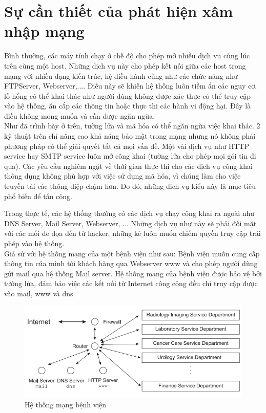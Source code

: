 \section{Sự cần thiết của phát hiện xâm nhập mạng}

\indent Bình thường, các máy tính chạy ở chế độ cho phép mở nhiều dịch vụ cùng lúc trên cùng một host. Những dịch vụ này cho phép kết nối giữa các host trong mạng với nhiều dạng kiến trúc, hệ điều hành cũng như các chức năng như FTPServer, Webserver,.... Điều này sẽ khiến hệ thống luôn tiềm ẩn các nguy cơ, lỗ hổng có thể khai thác như người dùng không được xác thực có thể truy cập vào hệ thống, ăn cắp các thông tin hoặc thực thi các hành vi động hại. Đây là điều không mong muốn và cần được ngăn ngừa.\\
\indent Như đã trình bày ở trên, tường lửa và mã hóa có thể ngăn ngừa việc khai thác. 2 kỹ thuật trên chỉ nâng cao khả năng bảo mật trong mạng nhưng nó không phải phương pháp có thể giải quyết tất cả mọi vấn đề. Một vài dịch vụ như HTTP service hay SMTP service luôn mở công khai (tường lửa cho phép mọi gói tin đi qua). Các yêu cầu nghiêm ngặt về thời gian thực thi cho các dịch vụ công khai thông dụng không phù hợp với việc sử dụng mã hóa, vì chúng làm cho việc truyền tải các thông điệp chậm hơn. Do đó, những dịch vụ kiểu này là mục tiêu phổ biến để tấn công.

Trong thực tế, các hệ thống thường có các dịch vụ chạy công khai ra ngoài như DNS Server, Mail Server, Webserver, ... Những dịch vụ như này sẽ phải đối mặt với các mối đe dọa đến từ hacker, những kẻ luôn muốn chiếm quyền truy cập trái phép vào hệ thống.  \\

\indent Giả sử với hệ thống mạng của một bệnh viện như sau: 
Bệnh viện muốn cung cấp thông tin của mình tới khách hàng qua Webserver www và cho phép người dùng gửi mail qua hệ thống Mail server. Hệ thống mạng của bệnh viện được bảo vệ bởi tường lửa, đảm bảo việc các kết nối từ Internet công cộng đều chỉ truy cập được vào mail, www và dns.\\

\begin{figure}[H]
    \centering
    \includegraphics{hospital}
    \caption{Hệ thống mạng bệnh viện}
\end{figure}{}

